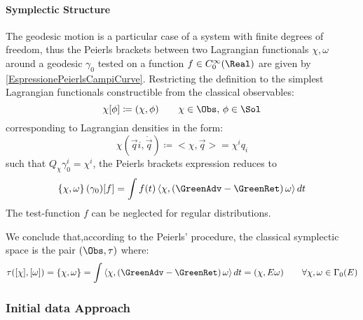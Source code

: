 \documentclass[Main]{subfiles}
\begin{document}
			\paragraph{Symplectic Structure}
				The geodesic motion is a particular case of a system with finite degrees of freedom, thus the Peierls brackets between two Lagrangian functionals $\chi, \omega$ around a geodesic $\gamma_0$ tested on a function $f \in C_0^\infty(\Real)$ are given by \ref{EspressionePeierlsCampiCurve}.
				Restricting the definition to the simplest Lagrangian functionals constructible from the classical observables:
				\begin{displaymath}
					\chi [\phi] \coloneqq (\chi, \phi) \qquad \chi \in \Obs,\, \phi \in \Sol
				\end{displaymath}
				corresponding to Lagrangian densities in the form:
				\begin{displaymath}
					\chi ( \vec{q}i, \dot{\vec{q}}) \coloneqq < \chi, \vec{q}> = \chi^i q_i
				\end{displaymath}
				such that $ Q_\chi \gamma_0^i = \chi^i$, the Peierls brackets expression reduces to
				\begin{displaymath}
					\left\lbrace\chi , \omega \right\rbrace (\gamma_0) [f] = \int f(t) \left\langle\chi, \left(\GreenAdv - \GreenRet \right)\omega \right\rangle dt
				\end{displaymath}
				The test-function $f$ can be neglected for regular distributions.

				\vspace{3.5mm}
				We conclude that,according to the Peierls' procedure,  the classical symplectic space is the pair $(\Obs, \tau)$ where:
				\begin{displaymath}
					\tau( [\chi], [\omega]) = \{\chi , \omega \} =\int \left\langle\chi, \left(\GreenAdv - \GreenRet \right)\omega \right\rangle dt = ( \chi, E \omega) \qquad \forall \chi,\omega \in \Gamma_0(E)
				\end{displaymath}
				
				
		\subsubsection{Initial data Approach}
\end{document}

